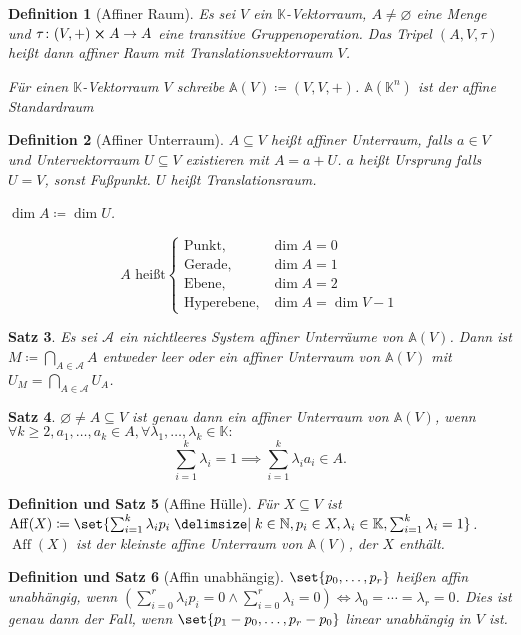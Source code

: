 \documentclass[a4paper]{article}
\newcounter{Sec}
\theoremstyle{marginbreak}
\newtheorem{definition}{Definition}[Sec]
\newtheorem{satz}[definition]{Satz}
\newtheorem{defsatz}[definition]{Definition und Satz}
\DeclareMathOperator{\Aff}{Aff}
\begin{document}
	\begin{definition}[Affiner Raum]
		Es sei $V$ ein $\mathbb{K}$-Vektorraum, $A\neq\varnothing$ eine Menge und
		$\tau\colon (V,+)\cross A\to A$ eine transitive Gruppenoperation. Das Tripel
		$(A, V, \tau)$ heißt dann affiner Raum mit Translationsvektorraum $V$.

		Für einen $\mathbb{K}$-Vektorraum $V$ schreibe $\mathbb{A}(V)\coloneqq(V, V, +)$.
		$\mathbb{A}(\mathbb{K}^n)$ ist der affine Standardraum
	\end{definition}
	\begin{definition}[Affiner Unterraum]
		$A\subseteq V$ heißt affiner Unterraum, falls $a\in V$ und Untervektorraum $U\subseteq V$
		existieren mit $A = a + U$. $a$ heißt Ursprung falls $U=V$, sonst Fußpunkt. $U$ heißt
		Translationsraum.

		$\dim A\coloneqq \dim U$.

		\begin{equation*}
			A\text{ heißt}
			\begin{cases}
				\text{Punkt}, &\dim A=0\\
				\text{Gerade}, &\dim A=1\\
				\text{Ebene}, &\dim A=2\\
				\text{Hyperebene}, &\dim A=\dim V - 1
			\end{cases}
		\end{equation*}
	\end{definition}
	\begin{satz}
		Es sei $\mathcal{A}$ ein nichtleeres System affiner Unterräume von $\mathbb{A}(V)$. Dann
		ist $M\coloneqq\bigcap_{A\in\mathcal{A}}A$ entweder leer oder ein affiner Unterraum von
		$\mathbb{A}(V)$ mit $U_M=\bigcap_{A\in\mathcal{A}}U_A$.
	\end{satz}
	\begin{satz}
		$\varnothing\neq A\subseteq V$ ist genau dann ein affiner Unterraum von $\mathbb{A}(V)$, wenn
		$\forall k\geq 2, a_1,\ldots, a_k\in A,\forall\lambda_1,\ldots,\lambda_k\in\mathbb{K}\colon$
		\[\sum_{i=1}^k \lambda_i =1\implies\sum_{i=1}^k\lambda_i a_i\in A.\]
	\end{satz}
	\begin{defsatz}[Affine Hülle]
		Für $X\subseteq V$ ist $\Aff(X)\coloneqq\set{\sum_{i=1}^k\lambda_i p_i\given k\in\mathbb{N}, p_i\in X, \lambda_i\in\mathbb{K}, \sum_{i=1}^k\lambda_i=1}$.
		$\Aff(X)$ ist der kleinste affine Unterraum von $\mathbb{A}(V)$, der $X$ enthält.
	\end{defsatz}
	\begin{defsatz}[Affin unabhängig]
		$\set{p_0,\ldots,p_r}$ heißen affin unabhängig, wenn
		$(\sum_{i=0}^r\lambda_i p_i=0 \wedge \sum_{i=0}^r\lambda_i = 0) \iff \lambda_0 = \cdots = \lambda_r = 0$.
		Dies ist genau dann der Fall, wenn $\set{p_1 - p_0, \ldots, p_r - p_0}$ linear unabhängig in $V$ ist.
	\end{defsatz}
\end{document}
